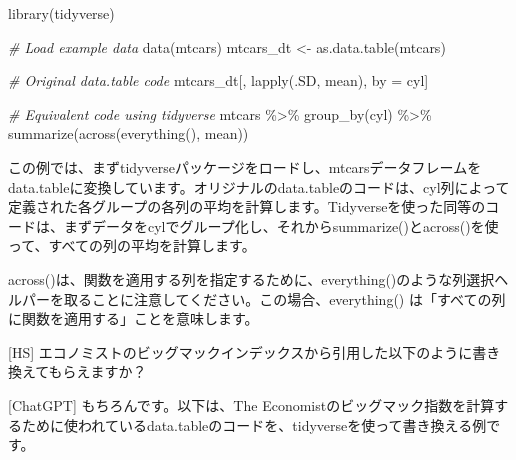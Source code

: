 \documentclass[
]{bxjsbook}
\newenvironment{Shaded}{\begin{snugshade}}{\end{snugshade}}
\newcommand{\CommentTok}[1]{\textcolor[rgb]{0.56,0.35,0.01}{\textit{#1}}}
\newcommand{\FunctionTok}[1]{\textcolor[rgb]{0.00,0.00,0.00}{#1}}
\newcommand{\NormalTok}[1]{#1}
\newcommand{\OtherTok}[1]{\textcolor[rgb]{0.56,0.35,0.01}{#1}}
\newcommand{\SpecialCharTok}[1]{\textcolor[rgb]{0.00,0.00,0.00}{#1}}
\theoremstyle{definition}
\theoremstyle{definition}
\theoremstyle{definition}
\theoremstyle{definition}
\theoremstyle{remark}
\begin{document}
\begin{Shaded}
\begin{Highlighting}[]
\FunctionTok{library}\NormalTok{(tidyverse)}

\CommentTok{\# Load example data}
\FunctionTok{data}\NormalTok{(mtcars)}
\NormalTok{mtcars\_dt }\OtherTok{\textless{}{-}} \FunctionTok{as.data.table}\NormalTok{(mtcars)}

\CommentTok{\# Original data.table code}
\NormalTok{mtcars\_dt[, }\FunctionTok{lapply}\NormalTok{(.SD, mean), by }\OtherTok{=}\NormalTok{ cyl]}

\CommentTok{\# Equivalent code using tidyverse}
\NormalTok{mtcars }\SpecialCharTok{\%\textgreater{}\%}
  \FunctionTok{group\_by}\NormalTok{(cyl) }\SpecialCharTok{\%\textgreater{}\%}
  \FunctionTok{summarize}\NormalTok{(}\FunctionTok{across}\NormalTok{(}\FunctionTok{everything}\NormalTok{(), mean))}
\end{Highlighting}
\end{Shaded}

この例では、まずtidyverseパッケージをロードし、mtcarsデータフレームをdata.tableに変換しています。オリジナルのdata.tableのコードは、cyl列によって定義された各グループの各列の平均を計算します。Tidyverseを使った同等のコードは、まずデータをcylでグループ化し、それからsummarize()とacross()を使って、すべての列の平均を計算します。

across()は、関数を適用する列を指定するために、everything()のような列選択ヘルパーを取ることに注意してください。この場合、everything() は「すべての列に関数を適用する」ことを意味します。

{[}HS{]} エコノミストのビッグマックインデックスから引用した以下のように書き換えてもらえますか？

{[}ChatGPT{]} もちろんです。以下は、The Economistのビッグマック指数を計算するために使われているdata.tableのコードを、tidyverseを使って書き換える例です。
\end{document}
